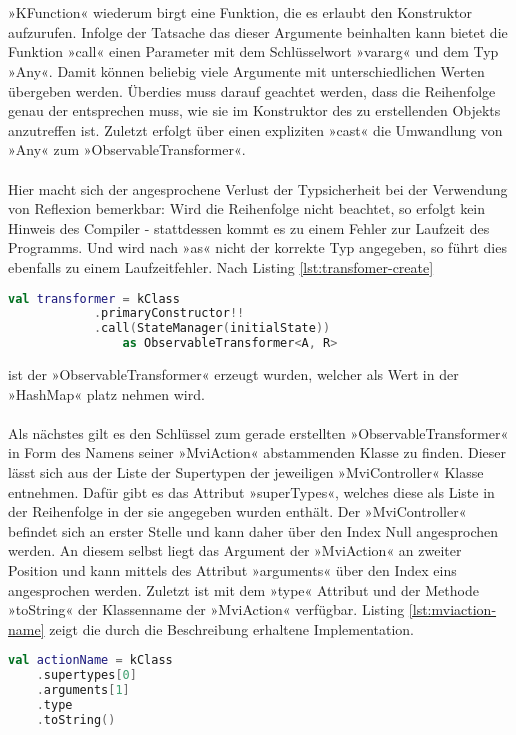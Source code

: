 \\\\
»KFunction« wiederum birgt eine Funktion, die es erlaubt den Konstruktor aufzurufen. Infolge der Tatsache das dieser Argumente beinhalten kann bietet die Funktion »call« einen Parameter mit dem Schlüsselwort »vararg« und dem Typ »Any«. Damit können beliebig viele Argumente mit unterschiedlichen Werten übergeben werden. Überdies muss darauf geachtet werden, dass die Reihenfolge genau der entsprechen muss, wie sie im Konstruktor des zu erstellenden Objekts anzutreffen ist. Zuletzt erfolgt über einen expliziten »cast« die Umwandlung von »Any« zum »ObservableTransformer«. 
\\\\
Hier macht sich der angesprochene Verlust der Typsicherheit bei der Verwendung von Reflexion bemerkbar: Wird die Reihenfolge nicht beachtet, so erfolgt kein Hinweis des Compiler - stattdessen kommt es zu einem Fehler zur Laufzeit des Programms. Und wird nach »as« nicht der korrekte Typ angegeben, so führt dies ebenfalls zu einem Laufzeitfehler. Nach Listing
\ref{lst:transfomer-create}
\begin{lstlisting}[caption={Konsruktor}, label={lst:transfomer-create},language=Kotlin]
val transformer = kClass
			.primaryConstructor!!
			.call(StateManager(initialState)) 
				as ObservableTransformer<A, R>
\end{lstlisting}
ist der »ObservableTransformer« erzeugt wurden, welcher als Wert in der »HashMap« platz nehmen wird.
\\\\
Als nächstes gilt es den Schlüssel zum gerade erstellten »ObservableTransformer« in Form des Namens seiner »MviAction« abstammenden Klasse zu finden. Dieser lässt sich aus der Liste der Supertypen der jeweiligen  »MviController« Klasse entnehmen. Dafür gibt es das Attribut »superTypes«, welches diese als Liste in der Reihenfolge in der sie angegeben wurden enthält. Der »MviController« befindet sich an erster Stelle und kann daher über den Index Null angesprochen werden. An diesem selbst liegt das Argument der »MviAction« an zweiter Position und kann mittels des Attribut »arguments« über den Index eins angesprochen werden. Zuletzt ist mit dem »type« Attribut und der Methode »toString« der Klassenname der »MviAction« verfügbar. Listing
\ref{lst:mviaction-name}
zeigt die durch die Beschreibung erhaltene Implementation. 
\begin{lstlisting}[caption={»MviAction« Name }, label={lst:mviaction-name},language=Kotlin]
val actionName = kClass
	.supertypes[0]
	.arguments[1]
	.type
	.toString()
\end{lstlisting}
